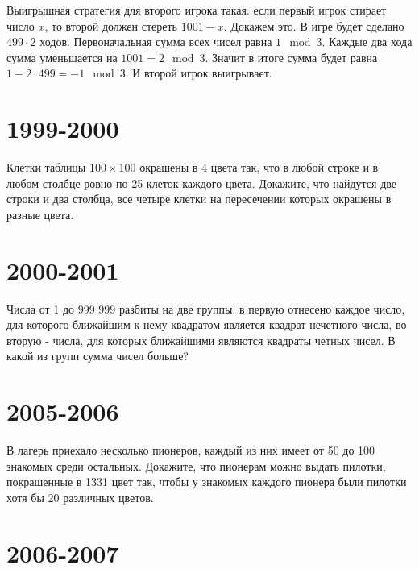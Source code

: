 \documentclass[11pt, a4paper]{problems_template}
\begin{document}
\begin{Solution}
Выигрышная стратегия для второго игрока такая: если первый игрок стирает число $x$, то второй должен стереть $1001 - x$. Докажем это.
В игре будет сделано $499 \cdot 2$ ходов. Первоначальная сумма всех чисел равна $1 \mod 3$. Каждые два хода сумма уменьшается на $1001 =  2 \mod 3$. Значит в итоге сумма будет равна $1 - 2 \cdot 499 = -1 \mod 3$. И второй игрок выигрывает.
\end{Solution}


\chapter{1999-2000}

\begin{exercise}
Клетки таблицы $100 \times 100$ окрашены в 4 цвета так, что в любой
строке и в любом столбце ровно по 25 клеток каждого цвета. Докажите,
что найдутся две строки и два столбца, все четыре клетки на пересечении которых окрашены в разные цвета.
\end{exercise}

\chapter{2000-2001}

\begin{exercise}
Числа от 1 до 999 999 разбиты на две группы: в первую отнесено каждое число, для которого ближайшим к нему квадратом является квадрат нечетного числа, во вторую - числа, для которых ближайшими являются квадраты четных чисел. В какой из групп сумма чисел больше?
\end{exercise}

\chapter{2005-2006}

\begin{exercise}
В лагерь приехало несколько пионеров, каждый из них имеет от 50 до 100 знакомых среди остальных. Докажите, что пионерам можно выдать пилотки, покрашенные в 1331 цвет так, чтобы у знакомых каждого пионера были пилотки хотя бы 20 различных цветов. 
\end{exercise}

\chapter{2006-2007}
\end{document}
